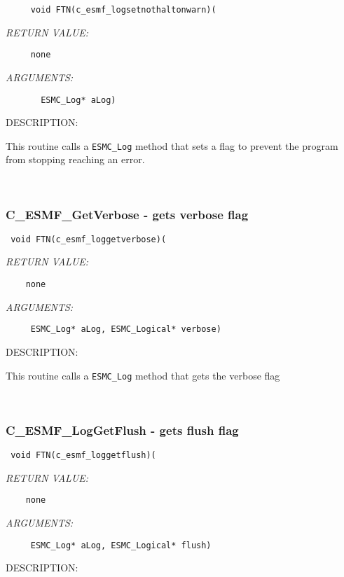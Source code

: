   
\begin{verbatim}     void FTN(c_esmf_logsetnothaltonwarn)( \end{verbatim}{\em RETURN VALUE:}
\begin{verbatim}     none\end{verbatim}{\em ARGUMENTS:}
\begin{verbatim}       ESMC_Log* aLog)
                        \end{verbatim}
{\sf DESCRIPTION:\\ }

 
    This routine calls a {\tt ESMC\_Log} method that sets a flag to
    prevent the program
    from stopping reaching an error.                             
 
\mbox{}\hrulefill\ 
 
\subsubsection [C\_ESMF\_GetVerbose] {C\_ESMF\_GetVerbose - gets verbose flag}


  
\begin{verbatim} void FTN(c_esmf_loggetverbose)(\end{verbatim}{\em RETURN VALUE:}
\begin{verbatim}    none\end{verbatim}{\em ARGUMENTS:}
\begin{verbatim}     ESMC_Log* aLog, ESMC_Logical* verbose)\end{verbatim}
{\sf DESCRIPTION:\\ }


    This routine calls a {\tt ESMC\_Log} method that gets the verbose flag
   
 
\mbox{}\hrulefill\ 
 
\subsubsection [C\_ESMF\_LogGetFlush] {C\_ESMF\_LogGetFlush - gets flush flag}


  
\begin{verbatim} void FTN(c_esmf_loggetflush)(\end{verbatim}{\em RETURN VALUE:}
\begin{verbatim}    none\end{verbatim}{\em ARGUMENTS:}
\begin{verbatim}     ESMC_Log* aLog, ESMC_Logical* flush)\end{verbatim}
{\sf DESCRIPTION:\\ }


